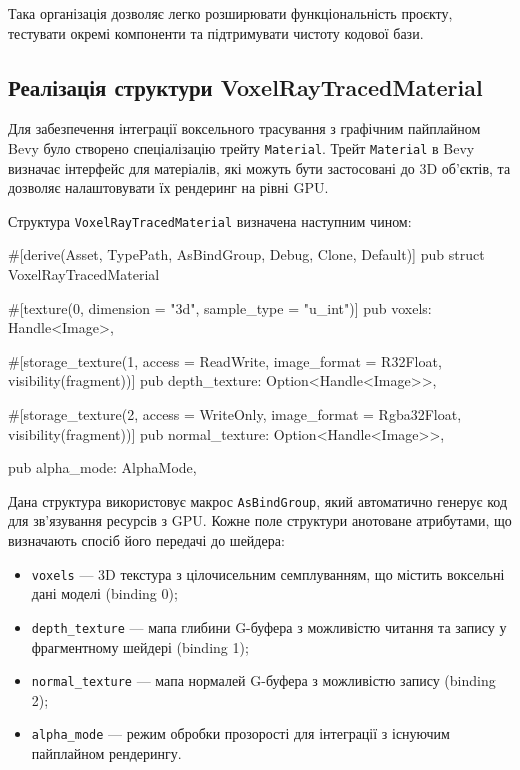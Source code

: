 Така організація дозволяє легко розширювати функціональність проєкту, тестувати окремі компоненти та підтримувати чистоту кодової бази.

\subsection{Реалізація структури VoxelRayTracedMaterial}

Для забезпечення інтеграції воксельного трасування з графічним пайплайном Bevy було створено спеціалізацію трейту \texttt{Material}. Трейт \texttt{Material} в Bevy визначає інтерфейс для матеріалів, які можуть бути застосовані до 3D об'єктів, та дозволяє налаштовувати їх рендеринг на рівні GPU.

Структура \texttt{VoxelRayTracedMaterial} визначена наступним чином:
\newpage

\begin{rustcode}
#[derive(Asset, TypePath, AsBindGroup, Debug, Clone, Default)]
pub struct VoxelRayTracedMaterial {
    #[texture(0, dimension = "3d", sample_type = "u_int")]
    pub voxels: Handle<Image>,

    #[storage_texture(1, access = ReadWrite, image_format =
R32Float, visibility(fragment))]
    pub depth_texture: Option<Handle<Image>>,

    #[storage_texture(2, access = WriteOnly, image_format =
Rgba32Float, visibility(fragment))]
    pub normal_texture: Option<Handle<Image>>,

    pub alpha_mode: AlphaMode,
}
\end{rustcode}

Дана структура використовує макрос \texttt{AsBindGroup}, який автоматично генерує код для зв'язування ресурсів з GPU. Кожне поле структури анотоване атрибутами, що визначають спосіб його передачі до шейдера:

\begin{itemize}[itemsep=0pt, topsep=0pt, label=$\diamond$]
    \item \texttt{voxels} --- 3D текстура з цілочисельним семплуванням, що містить воксельні дані моделі (binding 0);
    \item \texttt{depth\_texture} --- мапа глибини G-буфера з можливістю читання та запису у фрагментному шейдері (binding 1);
    \item \texttt{normal\_texture} --- мапа нормалей G-буфера з можливістю запису (binding 2);
    \item \texttt{alpha\_mode} --- режим обробки прозорості для інтеграції з існуючим пайплайном рендерингу.
\end{itemize}

